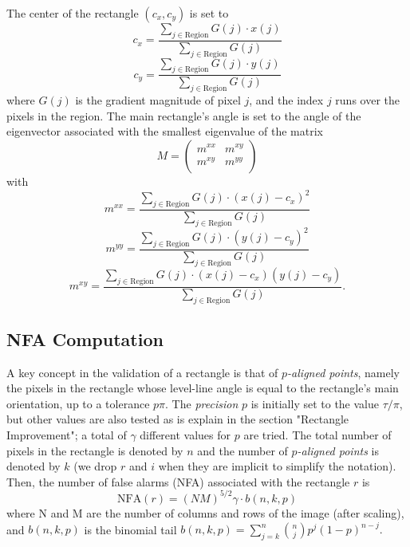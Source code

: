 \documentclass{ipol}
\begin{document}
The center of the rectangle $(c_x,c_y)$ is set to
$$
   c_x = \frac{\sum_{j\in \textrm{Region}} G(j) \cdot x(j)}
                           {\sum_{j\in \textrm{Region}} G(j)}
$$
$$
   c_y = \frac{\sum_{j\in \textrm{Region}} G(j) \cdot y(j)}
                           {\sum_{j\in \textrm{Region}} G(j)}
$$
where $G(j)$ is the gradient magnitude of pixel $j$, and the index $j$
runs over the pixels in the region. The main rectangle's angle is set
to the angle of the eigenvector associated with the smallest
eigenvalue of the matrix
$$
   M = \left(\begin{array}{cc}
               m^{xx} & m^{xy} \\
               m^{xy} & m^{yy} \\
             \end{array}\right)
$$
with
$$
   m^{xx} = \frac{\sum_{j\in\textrm{Region}}G(j)\cdot(x(j)-c_x)^2}
                              {\sum_{j\in\textrm{Region}}G(j)}
$$
$$
   m^{yy} = \frac{\sum_{j\in\textrm{Region}}G(j)\cdot(y(j)-c_y)^2}
                              {\sum_{j\in\textrm{Region}}G(j)}
$$
$$
   m^{xy} = \frac{\sum_{j\in\textrm{Region}}G(j)\cdot
                (x(j)-c_x)(y(j)-c_y)}{\sum_{j\in\textrm{Region}}G(j)}.
$$


\subsection{NFA Computation}

A key concept in the validation of a rectangle is that
of \emph{$p$-aligned points}, namely the pixels in the rectangle whose
level-line angle is equal to the rectangle's main orientation, up to a
tolerance $p\pi$. The \emph{precision} $p$ is initially set to the
value $\tau/\pi$, but other values are also tested as is explain in
the section "Rectangle Improvement"; a total of $\gamma$ different
values for $p$ are tried. The total number of pixels in the rectangle
is denoted by $n$ and the number of \emph{$p$-aligned points} is
denoted by $k$ (we drop $r$ and $i$ when they are implicit to simplify
the notation). Then, the number of false alarms (NFA) associated with
the rectangle $r$ is
$$
   \textrm{NFA}(r) = (NM)^{5/2}\gamma\cdot b(n,k,p)
$$
where N and M are the number of columns and rows of the image (after
scaling), and $b(n,k,p)$ is the binomial tail
$b(n,k,p)=\sum_{j=k}^{n}\binom{n}{j}p^j(1-p)^{n-j}.$
\end{document}

